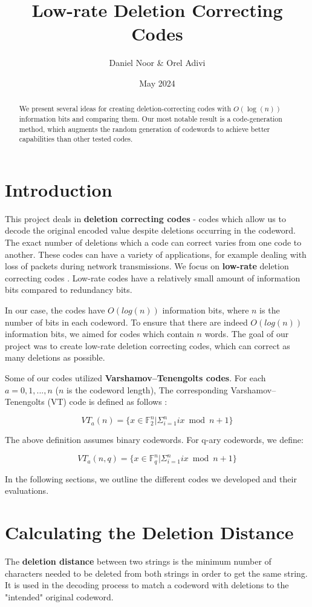 \documentclass{article}
\title{Low-rate Deletion Correcting Codes}
\author{Daniel Noor \& Orel Adivi}
\date{May 2024}
\begin{document}
\maketitle

\begin{abstract}
    We present several ideas for creating deletion-correcting codes with $O(\log(n))$ information bits and comparing them. Our most notable result is a code-generation method, which augments the random generation of codewords to achieve better capabilities than other tested codes.
\end{abstract}

\section{Introduction}
This project deals in \textbf{deletion correcting codes} - codes which allow us to decode the original encoded value despite deletions occurring in the codeword. The exact number of deletions which a code can correct varies from one code to another. These codes can have a variety of applications, for example dealing with loss of packets during network transmissions.
We focus on \textbf{low-rate} deletion correcting codes \cite{dcc_intro}. Low-rate codes have a relatively small amount of information bits compared to redundancy bits.

In our case, the codes have $O(log(n))$ information bits, where $n$ is the number of bits in each codeword. To ensure that there are indeed $O(log(n))$ information bits, we aimed for codes which contain $n$ words. The goal of our project was to create low-rate deletion correcting codes, which can correct as many deletions as possible.

Some of our codes utilized \textbf{Varshamov–Tenengolts codes}. For each $a = 0,1,...,n$ ($n$ is the codeword length), The corresponding Varshamov–Tenengolts (VT) code is defined as follows \cite{VT}:

\[VT_a(n) = \{x \in \mathbb{F}_2^n | \Sigma_{i=1}^n ix \bmod n+1\}\]

\noindent The above definition assumes binary codewords. For q-ary codewords, we define:

\[VT_a(n, q) = \{x \in \mathbb{F}_q^n | \Sigma_{i=1}^n ix \bmod n+1\}\]

\noindent In the following sections, we outline the different codes we developed and their evaluations.


\section{Calculating the Deletion Distance}
The \textbf{deletion distance} between two strings is the minimum number of characters needed to be deleted from both strings in order to get the same string. It is used in the decoding process to match a codeword with deletions to the "intended" original codeword.
\end{document}
